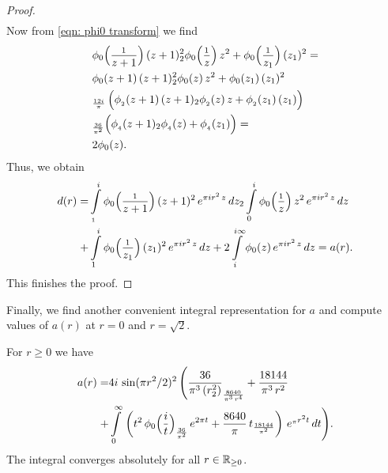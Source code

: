 \begin{proof}
\begin{align}
\end{align}
Now from \eqref{eqn: phi0 transform} we find
\begin{align}&\phi_0\Big(\frac{_1}{z+1}\Big)\,(z+1)^2_2\phi_0\Big(\frac{_1}{z}\Big)\,z^2+
\phi_0\Big(\frac{_1}{z_1}\Big)\,(z_1)^2=\notag\\
&\phi_0(z+1)\,(z+1)^2_2\phi_0(z)\,z^2+\phi_0(z_1)\,(z_1)^2\notag\\
&_\frac{12i}{\pi}\,\Big(\phi_{_2}(z+1)\,(z+1)_2\phi_{_2}(z)\,z+\phi_{_2}(z_1)\,(z_1)\Big)\notag\\
&_\frac{36}{\pi^2}\Big(\phi_{_4}(z+1)_2\phi_{_4}(z)+\phi_{_4}(z_1)\Big)=\notag\\
&2\phi_0(z).
  \end{align}
  Thus, we obtain
  \begin{align}
  d(r)=&\int\limits_{_1}^{i}\phi_0\Big(\frac{_1}{z+1}\Big)\,(z+1)^2\,e^{\pi i r^2 \,z}\,dz
  _2\int\limits_{0}^{i}\phi_0\Big(\frac{_1}{z}\Big)\,z^2\,e^{\pi i r^2 \,z}\,dz\notag\\
  +&\int\limits_{1}^{i}\phi_0\Big(\frac{_1}{z_1}\Big)\,(z_1)^2\,e^{\pi i r^2 \,z}\,dz
  +2\int\limits_{i}^{i\infty}\phi_0(z)\,e^{\pi i r^2 \,z}\,dz=a(r).\notag
\end{align}
This finishes the proof.
\end{proof}
Finally, we find another convenient integral representation for $a$ and compute values of $a(r)$ at $r=0$ and $r=\sqrt{2}$.
\begin{proposition}\label{prop: a another integral}
For $r\geq0$ we have
\begin{align}\label{eqn: a another integral}a(r)=&4i\,\sin(\pi r^2/2)^2\,\Bigg(\frac{36}{\pi^3\,(r^2_2)}_\frac{8640}{\pi^3\,r^4}+\frac{18144}{\pi^3\,r^2}\\ +&\int\limits_0^\infty\,\left(t^2\,\phi_0\Big(\frac{i}{t}\Big)_\frac{36}{\pi^2}\,e^{2\pi t}+\frac{8640}{\pi}\,t_\frac{18144}{\pi^2}\right)\,e^{_\pi r^2 t}\,dt \Bigg) .\notag\end{align}
The integral converges absolutely for all $r\in\mathbb{R}_{\geq 0}$.
\end{proposition}
